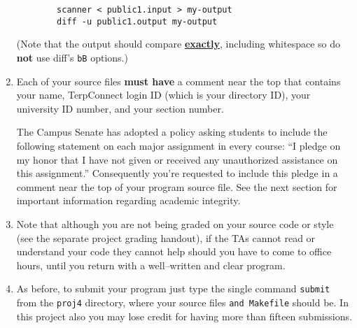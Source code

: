 \documentclass[11pt]{article}
\begin{document}
\begin{enumerate}
            \vspace{-5.5mm}

            \begin{center}

              \begin{BVerbatim}
        scanner < public1.input > my-output
        diff -u public1.output my-output
              \end{BVerbatim}

            \end{center}

            \vspace{-3mm}

            (Note that the output should compare
            \textbf{\underline{exactly}}, including whitespace so do
            \textbf{not} use diff's \texttt{bB} options.)

      \item Each of your source files \textbf{must have} a comment near the
            top that contains your name, TerpConnect login ID (which is your
            directory ID), your university ID number, and your section
            number.

            The Campus Senate has adopted a policy asking students to
            include the following statement on each major assignment in
            every course: ``I pledge on my honor that I have not given or
            received any unauthorized assistance on this assignment.''
            Consequently you're requested to include this pledge in a
            comment near the top of your program source file.  See the next
            section for important information regarding academic integrity.

      \item Note that although you are not being graded on your source code
            or style (see the separate project grading handout), if the TAs
            cannot read or understand your code they cannot help should you
            have to come to office hours, until you return with a
            well--written and clear program.

      \item As before, to submit your program just type the single command
            \texttt{submit} from the \texttt{proj4} directory, where your
            source files \texttt{and \texttt{Makefile}} should be.  In this
            project also you may lose credit for having more than fifteen
            submissions.

    \end{enumerate}
\end{document}
